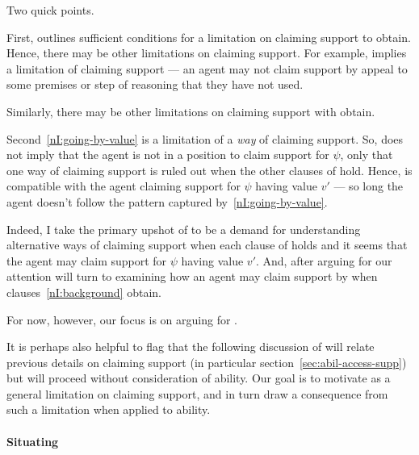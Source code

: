 \begin{note}
  Two quick points.
\end{note}

\begin{note}
  First, \nI{} outlines sufficient conditions for a limitation on claiming support to obtain.
  Hence, there may be other limitations on claiming support.
  For example, \ESU{} implies a limitation of claiming support --- an agent may not claim support by appeal to some premises or step of reasoning that they have not used.

  Similarly, there may be other limitations on claiming support with obtain.
\end{note}

\begin{note}
  Second~\ref{nI:going-by-value} is a limitation of a \emph{way} of claiming support.
  So, \nI{} does not imply that the agent is not in a position to claim support for \(\psi\), only that one way of claiming support is ruled out when the other clauses of \nI{} hold.
  Hence, \nI{} is compatible with the agent claiming support for \(\psi\) having value \(v'\) --- so long the agent doesn't follow the pattern captured by~\ref{nI:going-by-value}.

  Indeed, I take the primary upshot of \nI{} to be a demand for understanding alternative ways of claiming support when each clause of \nI{} holds and it seems that the agent may claim support for \(\psi\) having value \(v'\).
  And, after arguing for \nI{} our attention will turn to examining how an agent may claim support by \EAS{} when clauses~\ref{nI:background} obtain.

  For now, however, our focus is on arguing for \nI{}.

  It is perhaps also helpful to flag that the following discussion of \nI{} will relate previous details on claiming support (in particular section~\ref{sec:abil-access-supp}) but will proceed without consideration of ability.
  Our goal is to motivate \nI{} as a general limitation on claiming support, and in turn draw a consequence from such a limitation when applied to ability.
\end{note}


\paragraph{Situating \nI{}}

